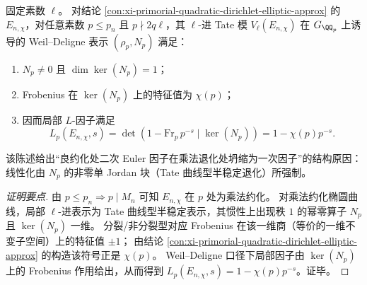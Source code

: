 \begin{conclusion}\label{con:xi-primorial-wd-linear-euler-factor}
固定素数 \(\ell\)。
对结论 \ref{con:xi-primorial-quadratic-dirichlet-elliptic-approx} 的 \(E_{n,\chi}\)，对任意素数 \(p\le p_n\) 且 \(p\nmid 2q\ell\)，其 \(\ell\)-进 Tate 模 \(V_\ell(E_{n,\chi})\) 在 \(G_{\QQ_p}\) 上诱导的 Weil--Deligne 表示 \((\rho_p,N_p)\) 满足：
\begin{enumerate}
  \item \(N_p\neq 0\) 且 \(\dim\ker(N_p)=1\)；
  \item Frobenius 在 \(\ker(N_p)\) 上的特征值为 \(\chi(p)\)；
  \item 因而局部 \(L\)-因子满足
  \[
  L_p(E_{n,\chi},s)=\det\!\left(1-\mathrm{Fr}_p\,p^{-s}\mid \ker(N_p)\right)=1-\chi(p)p^{-s}.
  \]
\end{enumerate}
该陈述给出“良约化处二次 Euler 因子在乘法退化处坍缩为一次因子”的结构原因：线性化由 \(N_p\) 的非零单 Jordan 块（Tate 曲线型半稳定退化）所强制。
\end{conclusion}
\begin{proof}[证明要点]
由 \(p\le p_n\Rightarrow p\mid M_n\) 可知 \(E_{n,\chi}\) 在 \(p\) 处为乘法约化。
对乘法约化椭圆曲线，局部 \(\ell\)-进表示为 Tate 曲线型半稳定表示，其惯性上出现秩 \(1\) 的幂零算子 \(N_p\) 且 \(\ker(N_p)\) 一维。
分裂/非分裂型对应 Frobenius 在该一维商（等价的一维不变子空间）上的特征值 \(\pm1\)；
由结论 \ref{con:xi-primorial-quadratic-dirichlet-elliptic-approx} 的构造该符号正是 \(\chi(p)\)。
Weil--Deligne 口径下局部因子由 \(\ker(N_p)\) 上的 Frobenius 作用给出，从而得到 \(L_p(E_{n,\chi},s)=1-\chi(p)p^{-s}\)。证毕。
\end{proof}

